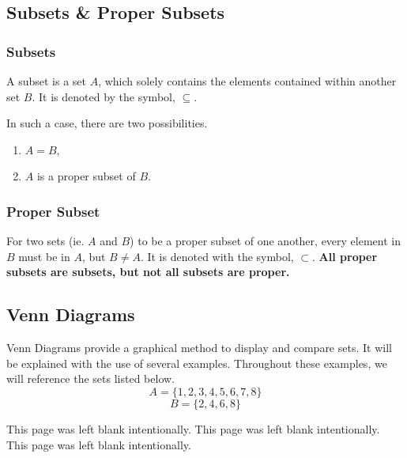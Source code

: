 \documentclass{report}
\begin{document}
\begin{flushleft}
\subsection{Subsets \& Proper Subsets}
\subsubsection{Subsets}
A subset is a set $A$, which solely contains the elements contained within another set $B$. It is denoted by the symbol, $\subseteq$.

In such a case, there are two possibilities.
\begin{enumerate}
    \item $A=B$,
    \item $A$ is a proper subset of $B$.
\end{enumerate}

\subsubsection{Proper Subset}
For two sets (ie. $A$ and $B$) to be a proper subset of one another, every element in $B$ must be in $A$, but $B\neq A$. It is denoted with the symbol, $\subset$.
\newline
\newline
\textbf{All proper subsets are subsets, but not all subsets are proper.}

\subsection{Venn Diagrams}
Venn Diagrams provide a graphical method to display and compare sets. It will be explained with the use of several examples. Throughout these examples, we will reference the sets listed below.
\begin{equation} \label{eq:sets.venn1}
    A=\{1,2,3,4,5,6,7,8\}
\end{equation}
\begin{equation} \label{eq:sets.venn2}
    B=\{2,4,6,8\}
\end{equation}

\newpage
\begin{center}
    This page was left blank intentionally.
    \newpage
    This page was left blank intentionally.
    \newpage
    This page was left blank intentionally.
    \newpage
\end{center}


\end{flushleft}
\end{document}
